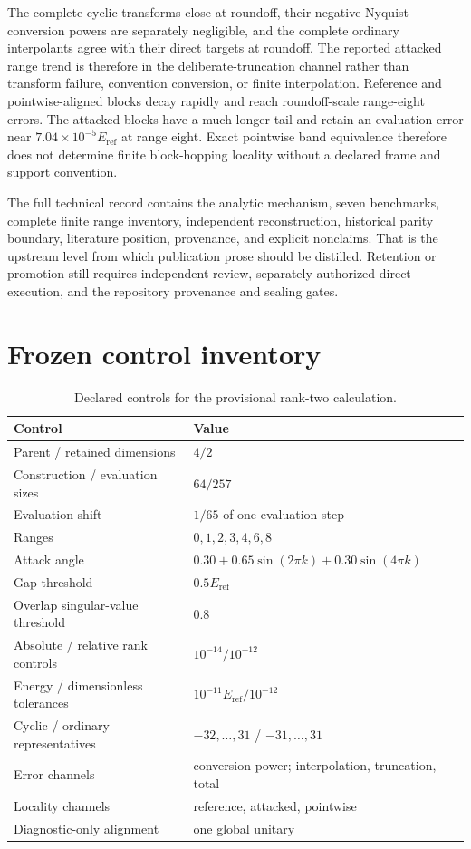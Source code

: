 \documentclass[11pt]{article}
\newcommand{\eref}{E_{\mathrm{ref}}}
\begin{document}
The complete cyclic transforms close at roundoff, their negative-Nyquist conversion
powers are separately negligible, and the complete ordinary interpolants agree with
their direct targets at roundoff.  The reported attacked range trend is therefore in the
deliberate-truncation channel rather than transform failure, convention conversion, or
finite interpolation.  Reference
and pointwise-aligned blocks decay rapidly and reach roundoff-scale range-eight errors.
The attacked blocks have a much longer tail and retain an evaluation error near
$7.04\times10^{-5}\eref$ at range eight.  Exact pointwise band equivalence therefore
does not determine finite block-hopping locality without a declared frame and support
convention.

The full technical record contains the analytic mechanism, seven benchmarks, complete
finite range inventory, independent reconstruction, historical parity boundary,
literature position, provenance, and explicit nonclaims.  That is the upstream level
from which publication prose should be distilled.  Retention or promotion still
requires independent review, separately authorized direct execution, and the repository
provenance and sealing gates.

\appendix

\section{Frozen control inventory}

\begin{table}[htbp]
\centering
\caption{Declared controls for the provisional rank-two calculation.}
\small
\begin{tabular}{ll}
\toprule
Control & Value \\
\midrule
Parent / retained dimensions & $4/2$ \\
Construction / evaluation sizes & $64/257$ \\
Evaluation shift & $1/65$ of one evaluation step \\
Ranges & $0,1,2,3,4,6,8$ \\
Attack angle & $0.30+0.65\sin(2\pi k)+0.30\sin(4\pi k)$ \\
Gap threshold & $0.5\eref$ \\
Overlap singular-value threshold & $0.8$ \\
Absolute / relative rank controls & $10^{-14}/10^{-12}$ \\
Energy / dimensionless tolerances & $10^{-11}\eref/10^{-12}$ \\
Cyclic / ordinary representatives & $-32,\ldots,31$ / $-31,\ldots,31$ \\
Error channels & conversion power; interpolation, truncation, total \\
Locality channels & reference, attacked, pointwise \\
Diagnostic-only alignment & one global unitary \\
\bottomrule
\end{tabular}
\end{table}
\end{document}
